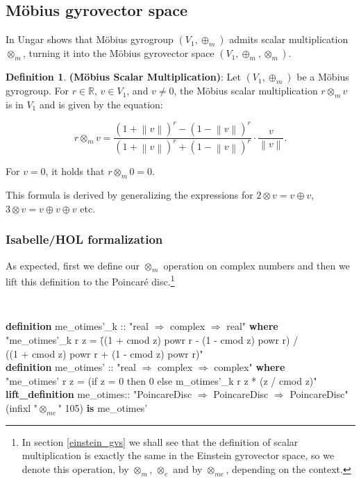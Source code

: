 \documentclass[a4paper]{article}
\newcommand{\tab}{\hspace{5mm}}
\theoremstyle{definition}
\newtheorem{definition}{Definition}[section]
\newcommand{\norm}[1]{\left\lVert#1\right\rVert}
\begin{document}
\subsection{M\"obius gyrovector space}

In \cite{ungar-analytic} Ungar shows that M\" obius gyrogroup
$(V_1, \oplus_m)$ admits scalar multiplication $\otimes_m$, turning it
into the M\" obius gyrovector space $(V_1, \oplus_m, \otimes_m)$.

\begin{definition}\textbf{(M\" obius Scalar Multiplication)}: Let
  $(V_1, \oplus_m)$ be a M\" obius gyrogroup. For $r \in \mathbb{R}$,
  $v \in V_1$, and $v \neq 0$, the M\" obius scalar multiplication
  $r\otimes_{m} v$ is in $V_1$ and is given by the equation:

  \begin{equation}
   \label{eq:otimes}
    r\otimes_{m} v = \frac{(1+\norm{v})^r - (1-\norm{v})^r}{(1+\norm{v})^r + (1-\norm{v})^r}\cdot\frac{v}{\norm{v}}.
  \end{equation}
  

  \noindent For $v=0$, it holds that $r\otimes_{m} 0 = 0$.
\end{definition}

This formula is derived by generalizing the expressions for
$2\otimes v = v \oplus v$, $3\otimes v = v \oplus v \oplus v$ etc.

\subsubsection{Isabelle/HOL formalization}

As expected, first we define our $\otimes_m$ operation on complex
numbers and then we lift this definition to the Poincar\'e
disc.\footnote{In section \ref{einstein_gvs} we shall see that the
  definition of scalar multiplication is exactly the same in the
  Einstein gyrovector space, so we denote this operation, by
  $\otimes_m$, $\otimes_e$ and by $\otimes_{me}$, depending on the
  context.}

{\tt
\begin{small}
\begin{tabbing}
{\bf definition}  me\_otimes'\_k  :: "real $\Rightarrow$ complex $\Rightarrow$ real" {\bf where}\\
\tab "me\_otimes'\_k r z = \=((1 + cmod z) powr r - (1 - cmod z) powr r) /\\
\>                  ((1 + cmod z) powr r + (1 - cmod z) powr r)"\\ 
{\bf definition} me\_otimes' :: "real $\Rightarrow$ complex $\Rightarrow$ complex" {\bf where}\\
\tab "me\_otimes' r z = (if z = 0 then 0 else m\_otimes'\_k r z * (z / cmod z)"\\
{\bf lift\_definition} me\_otimes:: "PoincareDisc $\Rightarrow$ PoincareDisc $\Rightarrow$ PoincareDisc" \\
\tab (infixl "$\otimes_{me}$" 105) {\bf is} me\_otimes'
\end{tabbing}
\end{small}
}
\end{document}

